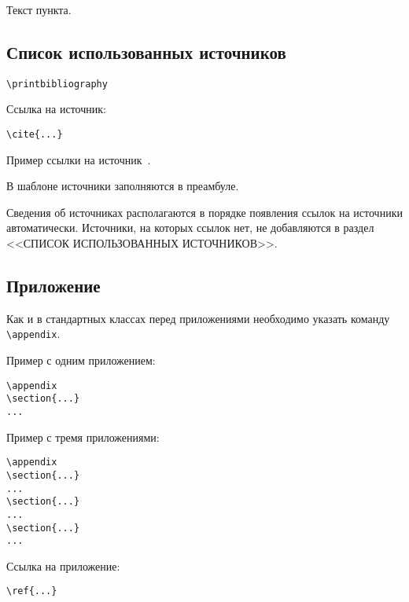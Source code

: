 \documentclass[14pt, a4paper, titlepage]{extarticle}
\renewcommand{\thesection}{\Asbuk{section}}
\let\oldsec\section
\renewcommand{\section}{
        \clearpage
        \phantomsection
        \refstepcounter{section}
        \addcontentsline{toc}{section}{\appendixname~\thesection}
        \oldsec*} %
\let\oldprintbibliography\printbibliography
\renewcommand{\printbibliography}{\oldprintbibliography[title={Список использованных источников}]}
\begin{document}
Текст пункта.

\subsection{Список использованных источников}

\begin{verbatim}
\printbibliography
\end{verbatim}

Ссылка на источник:
\begin{verbatim}
\cite{...}
\end{verbatim}

Пример ссылки на источник~\cite{bib:gostnir}.

В шаблоне источники заполняются в преамбуле.

Сведения об источниках располагаются в порядке появления ссылок на источники автоматически. Источники, на которых ссылок нет, не добавляются в раздел \uppercase{<<Список использованных источников>>}.

\subsection{Приложение}

Как и в стандартных классах перед приложениями необходимо указать команду \verb"\appendix".

Пример с одним приложением:
\begin{verbatim}
\appendix
\section{...}
...
\end{verbatim}

Пример с тремя приложениями:
\begin{verbatim}
\appendix
\section{...}
...
\section{...}
...
\section{...}
...
\end{verbatim}

Ссылка на приложение:
\begin{verbatim}
\ref{...}
\end{verbatim}
\end{document}
